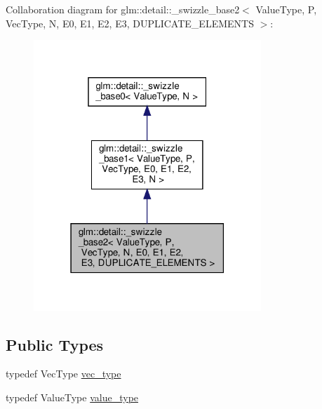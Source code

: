 Collaboration diagram for glm\+:\+:detail\+:\+:\+\_\+swizzle\+\_\+base2$<$ Value\+Type, P, Vec\+Type, N, E0, E1, E2, E3, D\+U\+P\+L\+I\+C\+A\+T\+E\+\_\+\+E\+L\+E\+M\+E\+N\+TS $>$\+:\nopagebreak
\begin{figure}[H]
\begin{center}
\leavevmode
\includegraphics[width=243pt]{structglm_1_1detail_1_1__swizzle__base2__coll__graph}
\end{center}
\end{figure}
\subsection*{Public Types}
\begin{DoxyCompactItemize}
\item 
typedef Vec\+Type \hyperlink{structglm_1_1detail_1_1__swizzle__base2_a5f999904e676a4f5b0bdaa157415ee1c}{vec\+\_\+type}
\item 
typedef Value\+Type \hyperlink{structglm_1_1detail_1_1__swizzle__base2_a656c11aaeeaca042deed88711c9dc063}{value\+\_\+type}
\end{DoxyCompactItemize}

